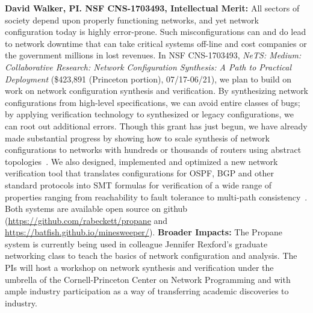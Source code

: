 \noindent
{\bf David Walker, PI. NSF CNS-1703493, Intellectual Merit:}
All sectors of society depend upon properly functioning networks, and
yet network configuration today is highly error-prone.  Such misconfigurations
can and do lead to network downtime that can take critical systems off-line
and cost companies or the government millions in lost revenues.
In NSF CNS-1703493, \emph{NeTS: Medium: Collaborative Research: Network Configuration Synthesis: A Path to Practical Deployment}
(\$423,891 (Princeton portion), 07/17-06/21), we plan to build on work on network configuration
synthesis and verification.  By synthesizing network configurations from
high-level specifications, we can avoid entire classes of bugs; by applying
verification technology to synthesized or legacy configurations, we can
root out additional errors.  Though this grant has just begun, we have already
made substantial progress by showing how to scale synthesis of network configurations to networks with hundreds or thousands of routers using abstract topologies~\cite{propane-at}.  We also designed, implemented and optimized a new
network verification tool that translates configurations for OSPF, BGP and
other standard protocols into SMT formulas for verification of a wide range
of properties ranging from reachability to fault tolerance to multi-path
consistency~\cite{minesweeper}.  Both systems are available open source
on github (\url{https://github.com/rabeckett/propane} and \url{https://batfish.github.io/minesweeper/}).
{\bf Broader Impacts:} The Propane system is currently being used in
colleague Jennifer Rexford's graduate networking class to teach the basics
of network configuration and analysis.  The PIs will host
a workshop on network synthesis and verification under the umbrella of the
Cornell-Princeton Center on Network Programming and with ample industry
participation as a way of transferring academic discoveries to industry.




